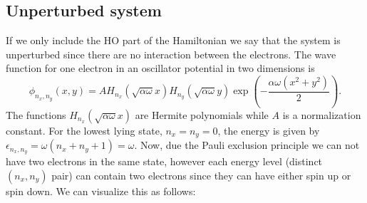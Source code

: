\documentclass[english, a4paper]{article}
\begin{document}
\subsection{Unperturbed system}
If we only include the HO part of the Hamiltonian we say that the system is unperturbed since there are no interaction between the electrons. The wave function for one 
electron in an oscillator potential in two dimensions is
\begin{equation}
 \phi_{n_x,n_y}(x,y) = AH_{n_x}(\sqrt{\alpha\omega}x)H_{n_y}(\sqrt{\alpha\omega}y)\exp\left(-\frac{\alpha\omega(x^2+y^2)}{2}\right).
\end{equation}
The functions $H_{n_x}(\sqrt{\alpha\omega}x)$ are Hermite polynomials while $A$ is a normalization constant. For the lowest lying state, $n_x = n_y = 0$, the energy is given by
$\epsilon_{n_x,n_y} = \omega(n_x+n_y+1) = \omega$. Now, due the Pauli exclusion principle we can not have two electrons in the same state, however each energy level (distinct $(n_x,n_y)$ pair)
can contain two electrons since they can have either spin up or spin down. We can visualize this as follows:
\end{document}
